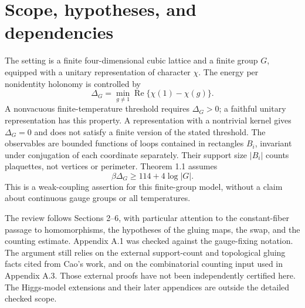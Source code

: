 \documentclass[10pt]{article}
\begin{document}
\section*{Scope, hypotheses, and dependencies}
The setting is a finite four-dimensional cubic lattice and a finite group \(G\), equipped with a unitary representation of character \(\chi\). The energy per nonidentity holonomy is controlled by \[\Delta_G=\min_{g\ne1}\operatorname{Re}\{\chi(1)-\chi(g)\}.\] A nonvacuous finite-temperature threshold requires \(\Delta_G>0\); a faithful unitary representation has this property. A representation with a nontrivial kernel gives \(\Delta_G=0\) and does not satisfy a finite version of the stated threshold. The observables are bounded functions of loops contained in rectangles \(B_i\), invariant under conjugation of each coordinate separately. Their support size \(|B_i|\) counts plaquettes, not vertices or perimeter. Theorem 1.1 assumes \[\beta\Delta_G\ge114+4\log|G|.\] This is a weak-coupling assertion for this finite-group model, without a claim about continuous gauge groups or all temperatures.\par
The review follows Sections 2–6, with particular attention to the constant-fiber passage to homomorphisms, the hypotheses of the gluing maps, the swap, and the counting estimate. Appendix A.1 was checked against the gauge-fixing notation. The argument still relies on the external support-count and topological gluing facts cited from Cao’s work, and on the combinatorial counting input used in Appendix A.3. Those external proofs have not been independently certified here. The Higgs-model extensions and their later appendices are outside the detailed checked scope.\par
\end{document}
